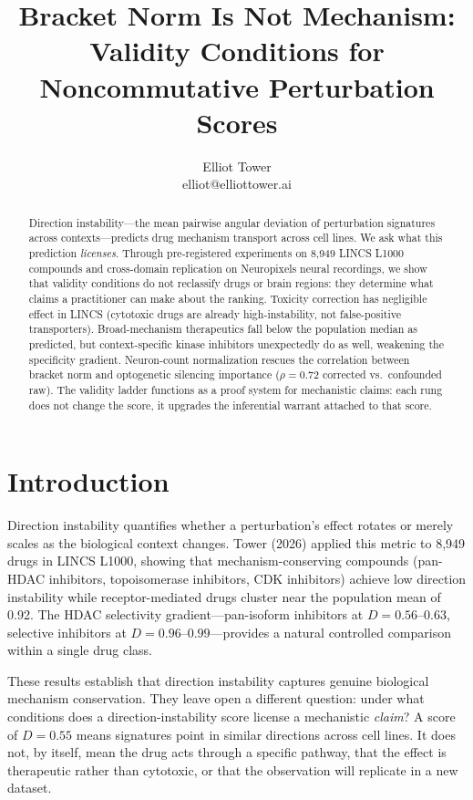 \documentclass{article}
\title{Bracket Norm Is Not Mechanism:\\ Validity Conditions for Noncommutative Perturbation Scores}
\author{\name Elliot Tower \\
      \email elliot@elliottower.ai}
\begin{document}
\maketitle

\begin{abstract}
Direction instability---the mean pairwise angular deviation of perturbation
signatures across contexts---predicts drug mechanism transport across cell
lines. We ask what this prediction \emph{licenses}. Through pre-registered
experiments on 8{,}949 LINCS L1000 compounds and cross-domain replication on
Neuropixels neural recordings, we show that validity conditions do not
reclassify drugs or brain regions: they determine what claims a practitioner
can make about the ranking. Toxicity correction has negligible effect in
LINCS (cytotoxic drugs are already high-instability, not false-positive
transporters). Broad-mechanism therapeutics fall below the population median
as predicted, but context-specific kinase inhibitors unexpectedly do as well,
weakening the specificity gradient. Neuron-count normalization rescues the
correlation between bracket norm and optogenetic silencing importance
($\rho = 0.72$ corrected vs.\ confounded raw). The validity ladder functions
as a proof system for mechanistic claims: each rung does not change the
score, it upgrades the inferential warrant attached to that score.
\end{abstract}

\section{Introduction}

Direction instability quantifies whether a perturbation's effect rotates or
merely scales as the biological context changes. Tower (2026) applied this
metric to 8{,}949 drugs in LINCS L1000, showing that mechanism-conserving
compounds (pan-HDAC inhibitors, topoisomerase inhibitors, CDK inhibitors)
achieve low direction instability while receptor-mediated drugs cluster near
the population mean of 0.92. The HDAC selectivity gradient---pan-isoform
inhibitors at $D = 0.56$--$0.63$, selective inhibitors at $D = 0.96$--$0.99$---provides
a natural controlled comparison within a single drug class.

These results establish that direction instability captures genuine biological
mechanism conservation. They leave open a different question: under what
conditions does a direction-instability score license a mechanistic \emph{claim}?
A score of $D = 0.55$ means signatures point in similar directions across cell
lines. It does not, by itself, mean the drug acts through a specific pathway,
that the effect is therapeutic rather than cytotoxic, or that the observation
will replicate in a new dataset.
\end{document}
